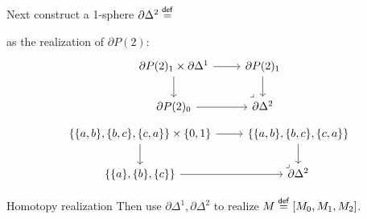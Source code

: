 \documentclass[14pt,aspectratio=169]{beamer}
\begin{document}
\begin{frame}
Next construct a 1-sphere \( \partial\Delta^2\stackrel{\mathsf{def}}{=} \)
 as the realization of \( \partial P(2) \):
\[%
\begin{tikzcd}[ampersand replacement=\&]
  {\partial P(2)_1\times \partial\Delta^1} \& {\partial P(2)_1} \\
  {\partial P(2)_0} \& {\partial\Delta^2}
  \arrow[from=1-1, to=1-2]
  \arrow[from=1-1, to=2-1]
  \arrow[from=1-2, to=2-2]
  \arrow[from=2-1, to=2-2]
  \arrow["\ulcorner"{pos=-0, rotate=180}, draw=none, from=2-2, to=1-1]
\end{tikzcd}\]
\[%
\begin{tikzcd}[ampersand replacement=\&]
  {\{\{a, b\}, \{b, c\}, \{c, a\}\}\times \{0, 1\}} \& {\{\{a, b\}, \{b, c\}, \{c, a\}\}} \\
  {\{\{a\}, \{b\}, \{c\}\}} \& {\partial\Delta^2}
  \arrow[from=1-1, to=1-2]
  \arrow[from=1-1, to=2-1]
  \arrow[from=1-2, to=2-2]
  \arrow[from=2-1, to=2-2]
  \arrow["\ulcorner"{pos=-0, rotate=180}, draw=none, from=2-2, to=1-1]
\end{tikzcd}\]
\end{frame}

\begin{frame}{Homotopy realization}
Then use \(  \partial\Delta^1, \partial\Delta^2 \) to realize \( M\stackrel{\mathsf{def}}{=}[M_0, M_1, M_2] \).
\[\]
\end{frame}
\end{document}
